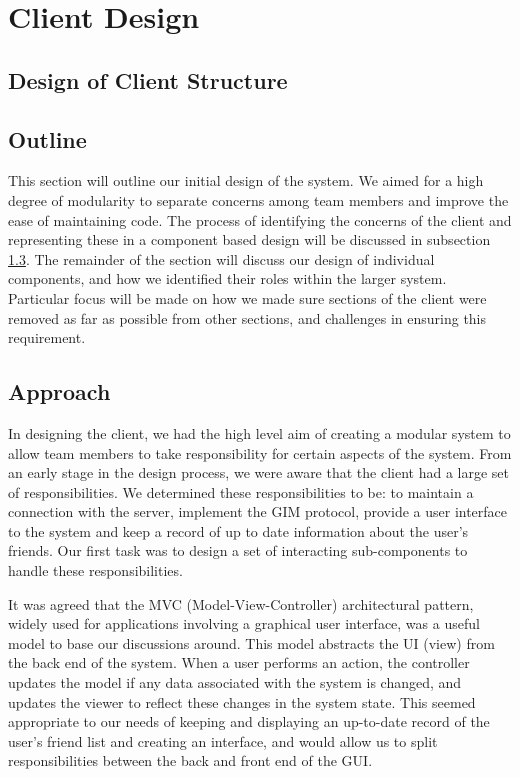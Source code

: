 \section{Client Design}
\label{client_design}

\subsection{Design of Client Structure}

\subsection{Outline}

This section will outline our initial design of the system. We aimed for a high degree of modularity to separate concerns among team members and improve the ease of maintaining code. The process of identifying the concerns of the client and representing these in a component based design will be discussed in subsection \ref{client_approach}. The remainder of the section will discuss our design of individual components, and how we identified their roles within the larger system. Particular focus will be made on how we made sure sections of the client were removed as far as possible from other sections, and challenges in ensuring this requirement. 

\subsection{Approach}
\label{client_approach}

In designing the client, we had the high level aim of creating a modular system to allow team members to take responsibility for certain aspects of the system. From an early stage in the design process, we were aware that the client had a large set of responsibilities. We determined these responsibilities to be: to maintain a connection with the server, implement the GIM protocol, provide a user interface to the system and keep a record of up to date information about the user's friends. Our first task was to design a set of interacting sub-components to handle these responsibilities.

It was agreed that the MVC (Model-View-Controller) architectural pattern, widely used for applications involving a graphical user interface, was a useful model to base our discussions around. This model abstracts the UI (view) from the back end of the system. When a user performs an action, the controller updates the model if any data associated with the system is changed, and updates the viewer to reflect these changes in the system state. This seemed appropriate to our needs of keeping and displaying an up-to-date record of the user's friend list and creating an interface, and would allow us to split responsibilities between the back and front end of the GUI.

